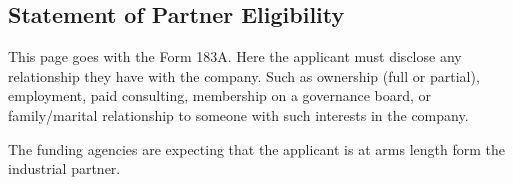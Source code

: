 \documentclass[12pt]{article}
\begin{document}
\setcounter{page}{1}

\subsection*{Statement of Partner Eligibility}

This page goes with the Form 183A. Here the applicant must disclose any relationship they have with the company. Such as  ownership (full or partial), employment, paid  consulting, membership on a governance board, or family/marital relationship to someone with such interests in the company.

The funding agencies are expecting that the applicant is at arms length form the industrial partner. 




 
\end{document}
